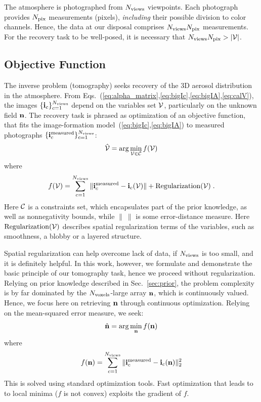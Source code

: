 \documentclass[10pt,twocolumn,letterpaper]{article}
\newcommand{\argmin}{\mathrm{arg}\min}
\begin{document}
The atmosphere is photographed from $N_{\rm views}$ viewpoints. Each photograph provides $N_{\rm pix}$  measurements (pixels), {\em including} their possible division to color channels. Hence, the data at our disposal comprises $N_{\rm views}N_{\rm pix}$ measurements.
For the recovery task to be well-posed, it is necessary that 
$N_{\rm views}N_{\rm pix}>|{\cal V}|$.


\subsection{Objective Function}
\label{sec:objective-function}

The inverse problem (tomography) seeks recovery of the 3D aerosol distribution in the atmosphere. From Eqs.~(\ref{eq:alpha_matrix},\ref{eq:bigIc},\ref{eq:bigIA},\ref{eq:calV}),
the images $\{ {\bf i}_c\}_{c=1}^{N_{\rm views}}$ depend on the variables set ${\cal V}$, particularly on the unknown field ${\bf n}$. The recovery task is phrased as optimization of an objective function, that fits the image-formation model~(\ref{eq:bigIc},\ref{eq:bigIA}) to
measured photographs $\{ {\bf i}^{\rm measured}_c\}_{c=1}^{N_{\rm views}}$:
\begin{equation}
  \label{eq:mingenobjective}
  \hat{\cal V} = \argmin_{{\cal V}\in {\cal C}} f({\cal V})
\end{equation}
where
\begin{equation}
  \label{eq:genobjective}
  f({\cal V}) = \sum_{c=1}^{N_{\rm views}}
  \| {\bf i}^{\rm measured}_c - {\bf i}_c({\cal V})\| + {\rm Regularization}({\cal V})
  \;.
\end{equation}
Here ${\cal C}$ is a constraints set, which encapsulates part of the prior knowledge,
as well as nonnegativity bounds, while $\|~\|$ is some error-distance measure.
Here ${\rm Regularization}({\cal V})$ describes spatial regularization terms of the variables, such as smoothness, a blobby or a layered structure.

Spatial regularization can help overcome lack of data, if $N_{\rm views}$ is too small, and it is definitely helpful. In this work, however, we formulate and demonstrate the basic principle of our tomography task, hence
we proceed without regularization. Relying on prior knowledge described in Sec.~\ref{sec:prior}, the problem complexity is by far dominated by the $N_{\rm voxels}$-large array ${\bf n}$, which is continuously valued. Hence, we focus here on retrieving ${\bf n}$ through continuous optimization. Relying on the mean-squared error measure, we seek:
\begin{equation}
  \label{eq:minobjectiveA}
  \hat{\bf n} =
      \argmin_{{\bf n}} f({\bf n})
\end{equation}
where
\begin{equation}
  \label{eq:objectiveA}
  f({\bf n})
   = \sum_{c=1}^{N_{\rm views}}
  \| {\bf i}^{\rm measured}_c - {\bf i}_c({\bf n})\|^2_2
\end{equation}
This is solved using standard optimization tools. Fast optimization that leads to
to local minima ($f$ is not convex) exploits the gradient of $f$.
\end{document}

